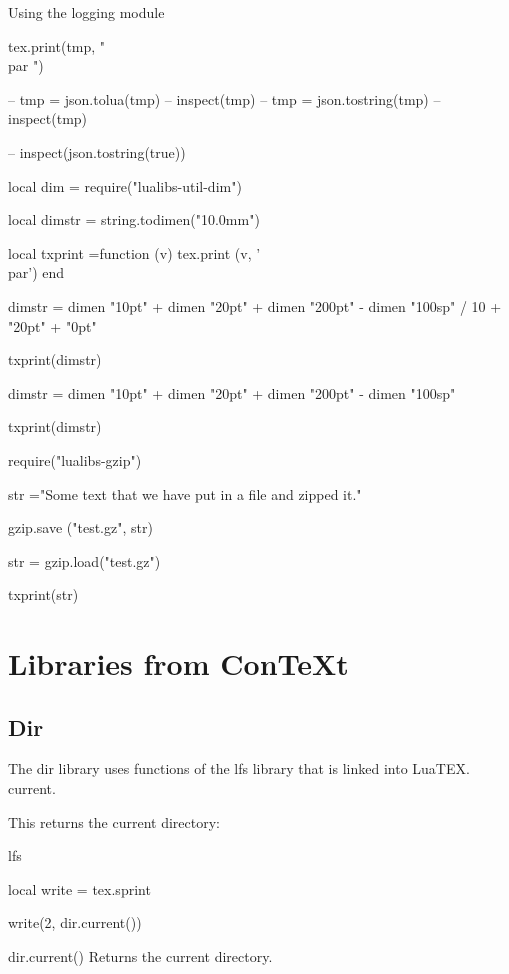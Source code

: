 \begin{texexample}{Using the logging module}{}
\begin{luacode}
tex.print(tmp, " \\par ")


-- tmp = json.tolua(tmp)
-- inspect(tmp)
-- tmp = json.tostring(tmp)
-- inspect(tmp)

-- inspect(json.tostring(true))


local dim =   require("lualibs-util-dim")

local dimstr = string.todimen("10.0mm")

local txprint =function (v)
     				tex.print (v, '\\par')
                  end

dimstr = dimen "10pt" + dimen "20pt" + dimen "200pt" - dimen "100sp" / 10 + "20pt" + "0pt"

txprint(dimstr)

dimstr = dimen "10pt" + dimen "20pt" + dimen "200pt" - dimen "100sp" 

txprint(dimstr)

require("lualibs-gzip") 

str ="Some text that we have put in a file and zipped it."

gzip.save ("test.gz", str)

str  = gzip.load("test.gz")


txprint(str)
\end{luacode}

\end{texexample}


\section{Libraries from ConTeXt}


\subsection*{Dir}

The dir library uses functions of the lfs library that is linked into LuaTEX.
current.

This returns the current directory:

\begin{texexample}{lfs}{}
\begin{luacode}
local write = tex.sprint

write(2, dir.current())

\end{luacode}
\end{texexample}


\begin{docLua}{dir.current()}
Returns the current directory.
\end{docLua}

